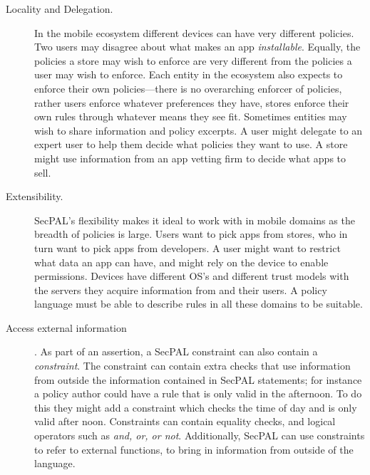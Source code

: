\documentclass[thesis.tex]{subfiles}
\begin{document}
\begin{description}
  \item[Locality and Delegation.]
    In the mobile ecosystem different devices can have very different policies.
    Two users may disagree about what makes an app \emph{installable}. Equally, the
    policies a store may wish to enforce are very different from the policies a user
    may wish to enforce. Each entity in the ecosystem also expects to enforce their
    own policies---there is no overarching enforcer of policies, rather users
    enforce whatever preferences they have, stores enforce their own rules through
    whatever means they see fit. Sometimes entities may wish to share information
    and policy excerpts. A user might delegate to an expert user to help them decide
    what policies they want to use. A store might use information from an app
    vetting firm to decide what apps to sell.

  \item[Extensibility.]
    SecPAL's flexibility makes it
    ideal to work with in mobile domains as the breadth of policies is large.
    Users want to pick apps from stores, who in turn want to pick apps from
    developers.  A user might want to restrict what data an app can have, and
    might rely on the device to enable permissions.  Devices have different OS's
    and different trust models with the servers they acquire information from
    and their users.  A policy language must be able to describe rules in all
    these domains to be suitable.

  \item[Access external information]. As part of an assertion, a SecPAL
    constraint can also contain a \emph{constraint}. The constraint can contain
    extra checks that use information from outside the information contained in
    SecPAL statements; for instance a policy author could have a rule that is only
    valid in the afternoon. To do this they might add a constraint which checks the
    time of day and is only valid after noon. Constraints can contain equality
    checks, and logical operators such as \emph{and, or, \emph{or} not}.
    Additionally, SecPAL can use constraints to refer to external functions, to
    bring in information from outside of the language.


\end{description}
\end{document}
